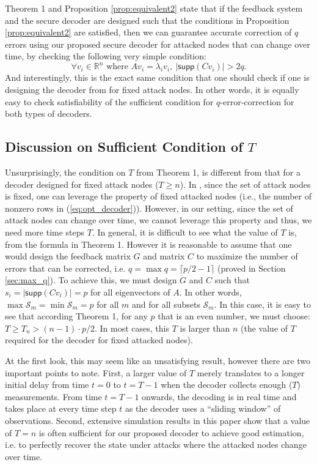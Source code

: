 \documentclass[journal]{IEEEtran}
\begin{document}
Theorem 1 and Proposition \ref{prop:equivalent2} state that if the feedback system and the secure decoder are designed such that the conditions in Proposition \ref{prop:equivalent2} are satisfied, then we can guarantee accurate correction of $q$ errors using our proposed secure decoder for attacked nodes that can change over time, by checking the following very simple condition:
\begin{equation}
\forall v_i \in \mathbb{R}^n \text{ where } Av_i =\lambda_i v_i, ~ \lvert \textsf{supp}(Cv_i) \rvert > 2q.  \nonumber
\end{equation}
And interestingly, this is the exact same condition that one should check if one is designing the decoder from \cite{Fawzi2014} for fixed attack nodes. In other words, it is equally easy to check satisfiability of the sufficient condition for $q$-error-correction for both types of decoders.




\subsection{Discussion on Sufficient Condition of $T$}

Unsurprisingly, the condition on $T$ from Theorem 1, is different from that for a decoder designed for fixed attack nodes ($T\geq n$). In \cite{Fawzi2014}, since the set of attack nodes is fixed, one can leverage the property of fixed attacked nodes (i.e., the number of nonzero rows in (\ref{eq:opt_decoder})). However, in our setting, since the set of attack nodes can change over time, we cannot leverage this property and thus, we need more time steps $T$.
In general, it is difficult to see what the value of $T$ is, from the formula in Theorem 1. However it is reasonable to assume that one would design the feedback matrix $G$ and matrix $C$ to maximize the number of errors that can be corrected, i.e. $q = \max q = \lceil p/2 - 1 \rceil$ (proved in Section \ref{sec:max_q}). To achieve this, we must design $G$ and $C$ such that $s_i = \lvert \textsf{supp} (C v_i) \rvert = p$ for all eigenvectors of $A$. In other words, $\operatorname{max} \mathcal{S}_m = \operatorname{min} \mathcal{S}_m = p$ for all $m$ and for all subsets $\mathcal{S}_m$. 
In this case, it is easy to see that according Theorem 1, for any $p$ that is an even number, we must choose: $T\geq T_n > (n-1) \cdot p/2$.
In most cases, this $T$ is larger than $n$ (the value of $T$ required for the decoder for fixed attacked nodes).

At the first look, this may seem like an unsatisfying result, however there are two important points to note. First, a larger value of $T$ merely translates to a longer initial delay from time $t = 0$ to $t=T-1$ when the decoder collects enough ($T$) measurements. From time $t=T-1$ onwards, the decoding is in real time and takes place at every time step $t$ as the decoder uses a ``sliding window'' of observations. Second, extensive simulation results in this paper show that a value of $T = n$ is often sufficient for our proposed decoder to achieve good estimation, i.e. to perfectly recover the state under attacks where the attacked nodes change over time. 
\end{document}
